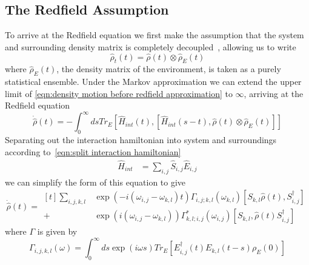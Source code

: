 \subsection{The Redfield Assumption}\label{sec:the redfield assumption}
To arrive at the Redfield equation
we first make the assumption that the
system and surrounding density
matrix is completely
decoupled~\cite{theory_open_quantum_systems},
allowing us to write
\begin{equation}
    \hat{\rho}_t(t) = \hat{\rho}(t) \otimes \hat{\rho}_E(t)
\end{equation}
where \(\hat{\rho}_E(t)\), the
density matrix of the environment,
is taken as a purely statistical ensemble.
Under the Markov approximation
we can extend the upper limit
of \cref{eqn:density motion before redfield approximation}
to \(\infty \), arriving at the Redfield
equation
\begin{equation}
    \dot{\hat{\rho}}(t) =
    - \int_0^{\infty} ds
    Tr_{E}[\hat{H}_{int}(t),
            [\hat{H}_{int}(s-t),
                    \hat{\rho}(t) \otimes \hat{\rho}_E(t)]]
\end{equation}
Separating out the interaction hamiltonian
into system and surroundings according
to~\cref{eqn:split interaction hamiltonian}
\begin{align}
    \hat{H}_{int} & = \sum_{i,j} \hat{S}_{i,j} \hat{E}_{i,j}
\end{align}
we can simplify the form of this equation to give~\cite{Manzano_2020}
\begin{equation}
    \dot{\hat{\rho{}}}(t) = \begin{aligned}[t]
        \sum_{i,j,k, l} &
        \exp{(-i(\omega_{i,j}-\omega_{k,l})t)}
        \Gamma_{i,j;k, l}(\omega_{k,l})
        [S_{k, l}\hat{\rho}(t),
        S^\dagger_{i,j}]  \\
        +               &
        \exp{(i(\omega_{i,j}-\omega_{k,l}))}
        \Gamma^*_{k, l; i,j}(\omega_{i,j})
        [S_{k, l},
            \hat{\rho}(t) S^\dagger_{i,j}]
    \end{aligned} \label{eqn:redfield equation gamma form}
\end{equation}
where \(\Gamma \) is given by
\begin{equation}
    \Gamma_{i,j, k,l}(\omega) =
    \int_0^\infty{}{
    ds \exp{(i\omega{}s)}
    Tr_{E}[E^\dagger_{i,j}(t)E_{k,l}(t-s)\rho_E(0)]
    }\label{eqn:gamma definition}
\end{equation}

